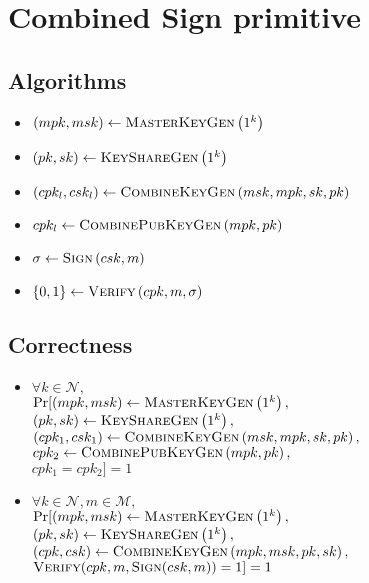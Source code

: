 \section{Combined Sign primitive}
  \subsection{Algorithms}
    \begin{itemize}
      \item $\left(mpk, msk\right) \gets \textsc{MasterKeyGen}\left(1^k\right)$
      \item $\left(pk, sk\right) \gets \textsc{KeyShareGen}\left(1^k\right)$
      \item $\left(cpk_l, csk_l\right) \gets \textsc{CombineKeyGen}\left(msk,
      mpk, sk, pk\right)$
      \item $cpk_l \gets \textsc{CombinePubKeyGen}\left(mpk, pk\right)$
      \item $\sigma \gets \textsc{Sign}\left(csk, m\right)$
      \item $\left\{0, 1\right\} \gets \textsc{Verify}\left(cpk, m,
      \sigma\right)$
    \end{itemize}

  \subsection{Correctness}
    \begin{itemize}
      \item $\forall k \in \mathcal{N},$ \\
      $\Pr[(mpk, msk) \gets \textsc{MasterKeyGen}\left(1^k\right),$ \\
      $\left(pk, sk\right) \gets \textsc{KeyShareGen}\left(1^k\right),$ \\
      $\left(cpk_1, csk_1\right) \gets \textsc{CombineKeyGen}\left(msk, mpk, sk,
      pk\right),$ \\
      $cpk_2 \gets \textsc{CombinePubKeyGen}\left(mpk, pk\right),$ \\
      $cpk_1 = cpk_2] = 1$

      \item $\forall k \in \mathcal{N}, m \in \mathcal{M},$ \\
      $\Pr[(mpk, msk) \gets \textsc{MasterKeyGen}\left(1^k\right),$ \\
      $\left(pk, sk\right) \gets \textsc{KeyShareGen}\left(1^k\right),$ \\
      $\left(cpk, csk\right) \gets \textsc{CombineKeyGen}\left(mpk, msk, pk,
      sk\right),$ \\
      $\textsc{Verify}(cpk, m, \textsc{Sign}(csk, m)) = 1] = 1$
    \end{itemize}

